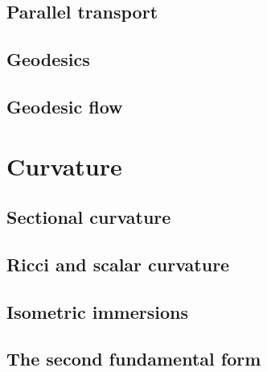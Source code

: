 \documentclass[letter-paper]{tufte-book}
\begin{document}
\section{Parallel transport}


\section{Geodesics}


\section{Geodesic flow}


\chapter{Curvature}


\section{Sectional curvature}


\section{Ricci and scalar curvature}


\section{Isometric immersions}


\section{The second fundamental form}
\end{document}
